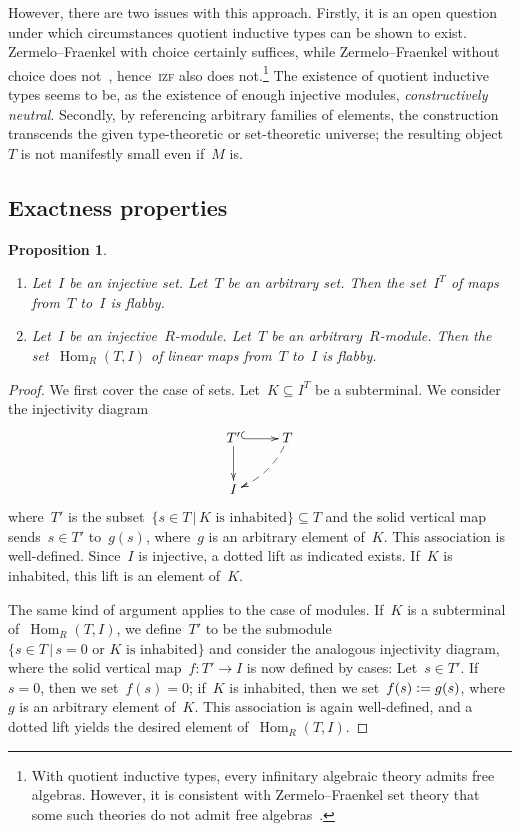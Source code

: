 \documentclass[oneside]{amsart}
\theoremstyle{definition}
\theoremstyle{plain}
\newtheorem{prop}[defn]{Proposition}
\theoremstyle{remark}
\newcommand{\defeq}{\vcentcolon=}
\DeclareMathOperator{\Hom}{Hom}
\renewcommand{\_}{\mathpunct{.}\,}
\begin{document}
However, there are two issues with this approach.
Firstly, it is an open question under which circumstances quotient inductive
types can be shown to exist. Zermelo--Fraenkel with choice certainly suffices,
while Zermelo--Fraenkel without choice does not~\cite[Section~9]{shulman-lumsdaine:hits},
hence~\textsc{izf} also does not.\footnote{With quotient inductive types, every infinitary
algebraic theory admits free algebras. However, it is consistent with
Zermelo--Fraenkel set theory that some such theories do not admit free
algebras~\cite{blass:free-algebras}.} The existence of quotient inductive types
seems to be, as the existence of enough injective modules, \emph{constructively
neutral}.
Secondly, by referencing arbitrary families of elements, the construction
transcends the given type-theoretic or set-theoretic universe; the resulting
object~$T$ is not manifestly small even if~$M$ is.


\subsection{Exactness properties}

\begin{prop}\label{prop:hom-flabby}
\begin{enumerate}
\item Let~$I$ be an injective set. Let~$T$ be an arbitrary set. Then the
set~$I^T$ of maps from~$T$ to~$I$ is flabby.
\item Let~$I$ be an injective~$R$-module. Let~$T$ be an arbitrary~$R$-module. Then the
set~$\Hom_R(T,I)$ of linear maps from~$T$ to~$I$ is flabby.
\end{enumerate}\end{prop}

\begin{proof}We first cover the case of sets. Let~$K \subseteq I^T$ be a
subterminal. We consider the injectivity diagram
\[ \xymatrix{
  T' \ar@{^{(}->}[r]\ar[d] & T \ar@{-->}@/^/[ld] \\
  I
} \]
where~$T'$ is the subset~$\{ s \in T \,|\, \text{$K$ is inhabited} \} \subseteq T$ and the
solid vertical map sends~$s \in T'$ to~$g(s)$, where~$g$ is an arbitrary element
of~$K$. This association is well-defined. Since~$I$ is injective, a dotted lift
as indicated exists. If~$K$ is inhabited, this lift is an element of~$K$.

The same kind of argument applies to the case of modules. If~$K$ is a
subterminal of~$\Hom_R(T,I)$, we define~$T'$ to be the submodule
$\{ s \in T \,|\, \text{$s = 0$ or $K$ is inhabited} \}$ and consider the
analogous injectivity diagram, where the solid vertical map~$f : T' \to I$ is now
defined by cases: Let~$s \in T'$. If~$s = 0$, then we set~$f(s) = 0$; if~$K$ is
inhabited, then we set~$f(s) \defeq g(s)$, where~$g$ is an arbitrary element
of~$K$. This association is again well-defined, and a dotted lift yields the
desired element of~$\Hom_R(T,I)$.
\end{proof}
\end{document}
